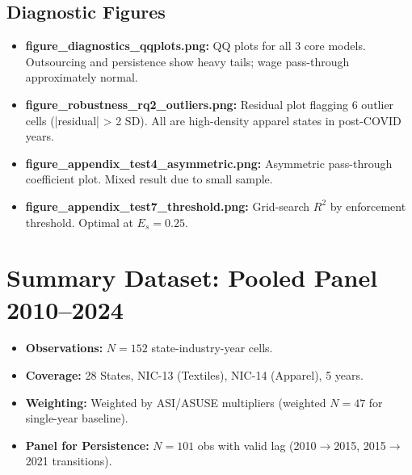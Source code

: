 \documentclass[11pt]{article}
\begin{document}
	\subsection*{Diagnostic Figures}
	\begin{itemize}
		\item \textbf{figure\_diagnostics\_qqplots.png:} QQ plots for all 3 core models. Outsourcing and persistence show heavy tails; wage pass-through approximately normal.
		\item \textbf{figure\_robustness\_rq2\_outliers.png:} Residual plot flagging 6 outlier cells (|residual| > 2 SD). All are high-density apparel states in post-COVID years.
		\item \textbf{figure\_appendix\_test4\_asymmetric.png:} Asymmetric pass-through coefficient plot. Mixed result due to small sample.
		\item \textbf{figure\_appendix\_test7\_threshold.png:} Grid-search $R^2$ by enforcement threshold. Optimal at $E_s = 0.25$.
	\end{itemize}
	
	\section{Summary Dataset: Pooled Panel 2010--2024}
	\begin{itemize}
		\item \textbf{Observations:} $N=152$ state-industry-year cells.
		\item \textbf{Coverage:} 28 States, NIC-13 (Textiles), NIC-14 (Apparel), 5 years.
		\item \textbf{Weighting:} Weighted by ASI/ASUSE multipliers (weighted $N=47$ for single-year baseline).
		\item \textbf{Panel for Persistence:} $N=101$ obs with valid lag (2010$\to$2015, 2015$\to$2021 transitions).
	\end{itemize}
	
\end{document}
